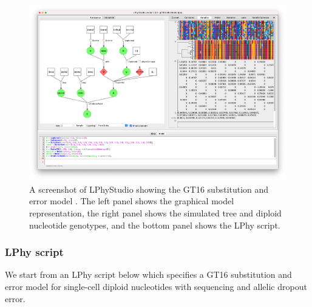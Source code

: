 \documentclass[10pt,letterpaper,table]{article}
\begin{document}
\begin{figure}[!ht]
    \centering
    \includegraphics[width=\textwidth]{manuscript/figs/lphystudio-gt16-mac.jpg}
    \caption{A screenshot of LPhyStudio showing the GT16 substitution and error model \cite{kozlov2022cellphy, chen2022accounting}. 
    The left panel shows the graphical model representation, the right panel shows the simulated tree and diploid nucleotide genotypes, and the bottom panel shows the LPhy script. }
\end{figure}

\subsubsection*{LPhy script}
We start from an LPhy script below which specifies a GT16 substitution and error model \cite{kozlov2022cellphy} for single-cell diploid nucleotides with sequencing and allelic dropout error.
\end{document}

